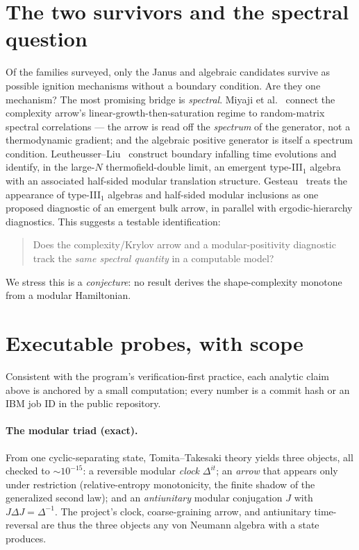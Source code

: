 \documentclass[11pt]{article}
\begin{document}
\section{The two survivors and the spectral question}

Of the families surveyed, only the Janus and algebraic candidates survive as
possible ignition mechanisms without a boundary condition. Are they one mechanism? The most promising bridge is
\emph{spectral}. Miyaji et al.~\cite{miyaji} connect the complexity arrow's
linear-growth-then-saturation regime to random-matrix spectral correlations ---
the arrow is read off the \emph{spectrum} of the generator, not a thermodynamic
gradient; and the algebraic positive generator is itself a spectrum condition.
Leutheusser--Liu~\cite{leutheusser} construct boundary infalling time evolutions
and identify, in the large-$N$ thermofield-double limit, an emergent
type-III$_1$ algebra with an associated half-sided modular translation
structure. Gesteau~\cite{gesteau} treats the appearance of type-III$_1$ algebras
and half-sided modular inclusions as one proposed diagnostic of an emergent bulk
arrow, in parallel with ergodic-hierarchy diagnostics. This suggests a testable
identification:

\begin{quote}
Does the complexity/Krylov arrow and a modular-positivity diagnostic track the
\emph{same spectral quantity} in a
computable model?
\end{quote}

We stress this is a \emph{conjecture}: no result derives the shape-complexity
monotone from a modular Hamiltonian.

\section{Executable probes, with scope}

Consistent with the program's verification-first practice, each analytic claim
above is anchored by a small computation; every number is a commit hash or an IBM
job ID in the public repository.

\paragraph{The modular triad (exact).} From one
cyclic-separating state, Tomita--Takesaki theory yields three objects, all checked
to $\sim10^{-15}$: a reversible modular \emph{clock} $\Delta^{it}$; an
\emph{arrow} that appears only under restriction (relative-entropy monotonicity,
the finite shadow of the generalized second law); and an \emph{antiunitary}
modular conjugation $J$ with $J\Delta J=\Delta^{-1}$. The project's clock,
coarse-graining arrow, and antiunitary time-reversal are thus the three objects
any von Neumann algebra with a state produces.
\end{document}
